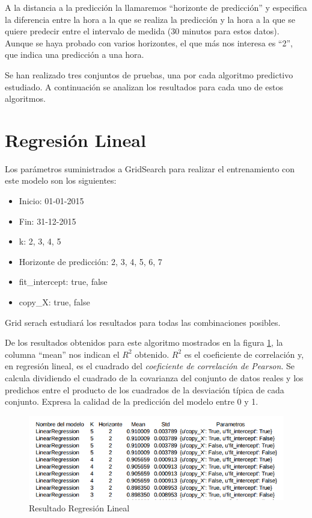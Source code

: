 A la distancia a la predicción la llamaremos ``horizonte de predicción'' y especifica la diferencia entre la hora a la que se realiza la predicción y la hora a la que se quiere predecir entre el intervalo de medida (30 minutos para estos datos). Aunque se haya probado con varios horizontes, el que más nos interesa es ``2'', que indica una predicción a una hora.

Se han realizado tres conjuntos de pruebas, una por cada algoritmo predictivo estudiado. A continuación se analizan los resultados para cada uno de estos algoritmos.

\section{Regresión Lineal}
\label{makereference7.1}
Los parámetros suministrados a GridSearch para realizar el entrenamiento con este modelo son los siguientes:

\begin{itemize}
\item Inicio: 01-01-2015
\item Fin: 31-12-2015
\item k: 2, 3, 4, 5
\item Horizonte de predicción: 2, 3, 4, 5, 6, 7
\item fit\_intercept: true, false
\item copy\_X: true, false 
\end{itemize}

Grid serach estudiará los resultados para todas las combinaciones posibles.

De los resultados obtenidos para este algoritmo mostrados en la figura \ref{resultado_linear}, la columna ``mean'' nos indican el \(R^{2}\) obtenido. \(R^{2}\) es el coeficiente de correlación y, en regresión lineal, es el cuadrado del \textit{coeficiente de correlación de Pearson}. Se calcula dividiendo el cuadrado de la covarianza del conjunto de datos reales y los predichos entre el producto de los cuadrados de la desviación típica de cada conjunto. Expresa la calidad de la predicción del modelo entre 0 y 1.

\begin{figure}[htb]
	\begin{center}
		\includegraphics[width=14cm]{figures/resultado_linear.png}
		\caption{Resultado Regresión Lineal \label{resultado_linear}}
	\end{center}
\end{figure}

